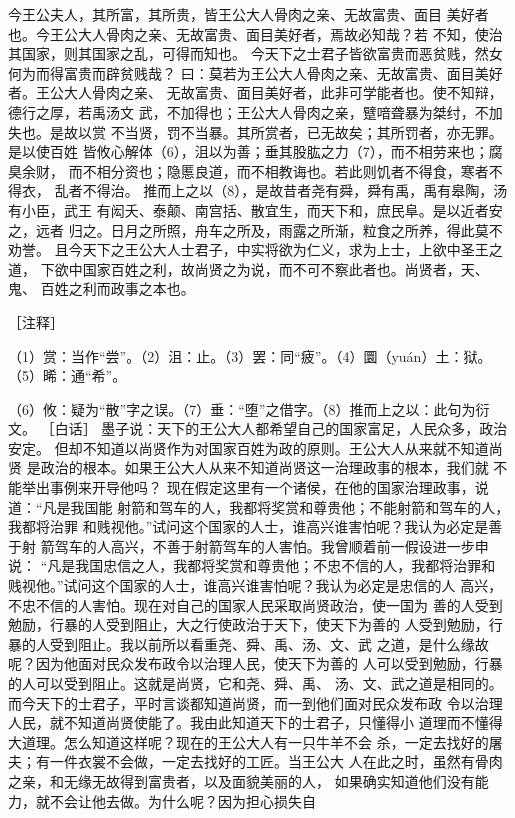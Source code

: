 \documentclass[12pt,UTF8]{ctexbook}
\begin{document}
今王公夫人，其所富，其所贵，皆王公大人骨肉之亲、无故富贵、面目 
美好者也。今王公大人骨肉之亲、无故富贵、面目美好者，焉故必知哉？若 
不知，使治其国家，则其国家之乱，可得而知也。 
今天下之士君子皆欲富贵而恶贫贱，然女何为而得富贵而辟贫贱哉？ 
曰：莫若为王公大人骨肉之亲、无故富贵、面目美好者。王公大人骨肉之亲、 
无故富贵、面目美好者，此非可学能者也。使不知辩，德行之厚，若禹汤文 
武，不加得也；王公大人骨肉之亲，躄喑聋暴为桀纣，不加失也。是故以赏 
不当贤，罚不当暴。其所赏者，已无故矣；其所罚者，亦无罪。是以使百姓 
皆攸心解体（6），沮以为善；垂其股肱之力（7），而不相劳来也；腐臭余财， 
而不相分资也；隐慝良道，而不相教诲也。若此则饥者不得食，寒者不得衣， 
乱者不得治。 
推而上之以（8），是故昔者尧有舜，舜有禹，禹有皋陶，汤有小臣，武王 
有闳夭、泰颠、南宫括、散宜生，而天下和，庶民阜。是以近者安之，远者 
归之。日月之所照，舟车之所及，雨露之所渐，粒食之所养，得此莫不劝誉。 
且今天下之王公大人士君子，中实将欲为仁义，求为上士，上欲中圣王之道， 
下欲中国家百姓之利，故尚贤之为说，而不可不察此者也。尚贤者，天、鬼、 
百姓之利而政事之本也。 


［注释］ 

（1）赏：当作“尝”。（2）沮：止。（3）罢：同“疲”。（4）圜（yuán）土：狱。（5）晞：通“希”。 

（6）攸：疑为“散”字之误。（7）垂：“堕”之借字。（8）推而上之以：此句为衍文。 
［白话］ 
墨子说：天下的王公大人都希望自己的国家富足，人民众多，政治安定。 
但却不知道以尚贤作为对国家百姓为政的原则。王公大人从来就不知道尚贤 
是政治的根本。如果王公大人从来不知道尚贤这一治理政事的根本，我们就 
不能举出事例来开导他吗？ 
现在假定这里有一个诸侯，在他的国家治理政事，说道：“凡是我国能 
射箭和驾车的人，我都将奖赏和尊贵他；不能射箭和驾车的人，我都将治罪 
和贱视他。”试问这个国家的人士，谁高兴谁害怕呢？我认为必定是善于射 
箭驾车的人高兴，不善于射箭驾车的人害怕。我曾顺着前一假设进一步申说： 
“凡是我国忠信之人，我都将奖赏和尊贵他；不忠不信的人，我都将治罪和 
贱视他。”试问这个国家的人士，谁高兴谁害怕呢？我认为必定是忠信的人 
高兴，不忠不信的人害怕。现在对自己的国家人民采取尚贤政治，使一国为 
善的人受到勉励，行暴的人受到阻止，大之行使政治于天下，使天下为善的 
人受到勉励，行暴的人受到阻止。我以前所以看重尧、舜、禹、汤、文、武 
之道，是什么缘故呢？因为他面对民众发布政令以治理人民，使天下为善的 
人可以受到勉励，行暴的人可以受到阻止。这就是尚贤，它和尧、舜、禹、 
汤、文、武之道是相同的。 
而今天下的士君子，平时言谈都知道尚贤，而一到他们面对民众发布政 
令以治理人民，就不知道尚贤使能了。我由此知道天下的士君子，只懂得小 
道理而不懂得大道理。怎么知道这样呢？现在的王公大人有一只牛羊不会 
杀，一定去找好的屠夫；有一件衣裳不会做，一定去找好的工匠。当王公大 
人在此之时，虽然有骨肉之亲，和无缘无故得到富贵者，以及面貌美丽的人， 
如果确实知道他们没有能力，就不会让他去做。为什么呢？因为担心损失自 
\end{document}
